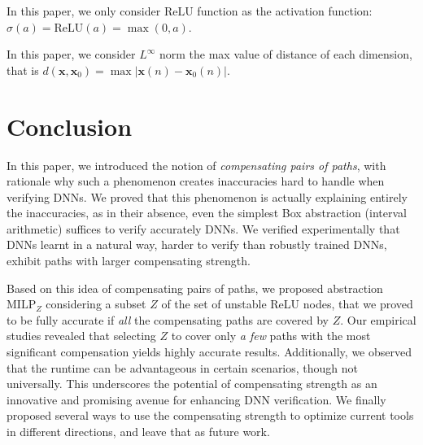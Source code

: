\documentclass[a4paper,UKenglish,cleveref, autoref, thm-restate]{lipics-v2021}
\newcommand{\vx}{\boldsymbol{x}}
\newcommand{\MILP}{{\textrm{MILP}}}
\newcommand{\ReLU}{\mathrm{ReLU}}
\begin{document}
	In this paper, we only consider $\ReLU$ function as the activation function: $\sigma(a)=\ReLU(a)=\max(0,a)$. 
	
	In this paper, we consider $L^{\infty}$ norm the max value of distance of each dimension, that is $d(\vx,\boldsymbol{x}_0)=\max |\boldsymbol{x}(n)-\boldsymbol{x}_0(n)|$. 
	\fi
	
	















\section{Conclusion}

In this paper, we introduced the notion of {\em compensating pairs of paths}, with rationale why such a phenomenon creates inaccuracies hard to handle when verifying DNNs. We proved that this phenomenon is actually explaining entirely the inaccuracies, as in their absence, even the simplest Box abstraction (interval arithmetic) suffices to verify accurately DNNs. We verified experimentally that DNNs learnt in a natural way, harder to verify than robustly trained DNNs, exhibit paths with larger compensating strength. 



Based on this idea of compensating pairs of paths, we proposed abstraction $\MILP_{Z}$ considering a subset $Z$ of the set of unstable ReLU nodes, that we proved to be fully accurate if {\em all} the compensating paths are covered by $Z$. Our empirical studies revealed that selecting $Z$ to cover only {\em a few} paths with the most significant compensation yields highly accurate results. Additionally, we observed that the runtime can be advantageous in certain scenarios, though not universally. This underscores the potential of compensating strength as an innovative and promising avenue for enhancing DNN verification.
 We finally proposed several ways to use the compensating strength to optimize current tools in different directions, and leave that as future work.

\newpage




\newpage

\appendix


\end{document}
